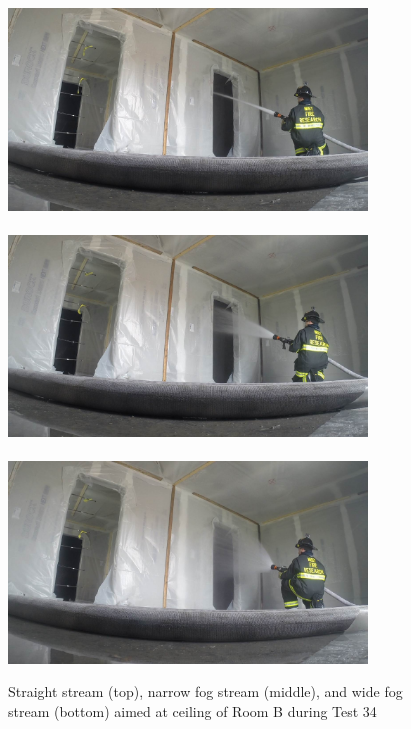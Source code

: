 \documentclass[12pt,oneside]{book}
\begin{document}
\begin{figure}[!ht]
\includegraphics[trim=23cm 6.5cm 4cm 6cm, clip=true, width=3.75in]{../Pictures/SS_Room_B_Test_34}
\\~\\
\includegraphics[trim=23cm 6.5cm 4cm 6cm, clip=true, width=3.75in]{../Pictures/NF_Room_B_Test_34}
\\~\\
\includegraphics[trim=23cm 6.5cm 4cm 6cm, clip=true, width=3.75in]{../Pictures/WF_Room_B_Test_34}
\caption[Straight Stream, Narrow Fog Stream, and Wide Fog Stream during Test 34]{Straight stream (top), narrow fog stream (middle), and wide fog stream (bottom) aimed at ceiling of Room B during Test 34}
\label{fig:test_34_pic}
\end{figure}
\end{document}
